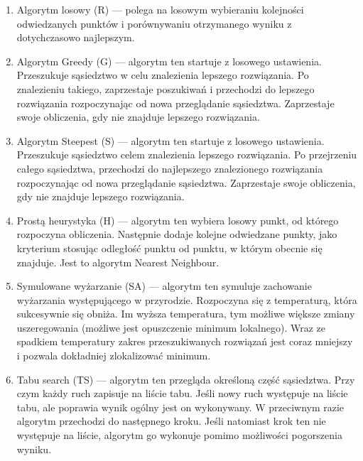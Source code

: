 \begin{enumerate}

\item Algorytm losowy (R) --- polega na losowym wybieraniu kolejności odwiedzanych punktów i 
porównywaniu otrzymanego wyniku z dotychczasowo najlepszym.

\item Algorytm Greedy (G) --- algorytm ten startuje z losowego ustawienia. Przeszukuje 
sąsiedztwo w celu znalezienia lepszego rozwiązania. Po znalezieniu takiego, zaprzestaje 
poszukiwań i przechodzi do lepszego rozwiązania rozpoczynając od nowa przeglądanie sąsiedztwa.
Zaprzestaje swoje obliczenia, gdy nie znajduje lepszego rozwiązania.

\item Algorytm Steepest (S) --- algorytm ten startuje z losowego ustawienia. Przeszukuje 
sąsiedztwo celem znalezienia lepszego rozwiązania. Po przejrzeniu całego sąsiedztwa, przechodzi 
do najlepszego znalezionego rozwiązania rozpoczynając od nowa przeglądanie sąsiedztwa.
Zaprzestaje swoje obliczenia, gdy nie znajduje lepszego rozwiązania.

\item Prostą heurystyka (H) --- algorytm ten wybiera losowy punkt, od którego rozpoczyna obliczenia.
Następnie dodaje kolejne odwiedzane punkty, jako kryterium stosując odległość punktu od punktu, w 
którym obecnie się znajduje. Jest to algorytm Nearest Neighbour.

\item Symulowane wyżarzanie (SA) --- algorytm ten symuluje zachowanie wyżarzania występującego w 
przyrodzie. Rozpoczyna się z temperaturą, która sukcesywnie się obniża. Im wyższa temperatura, tym
możliwe większe zmiany uszeregowania (możliwe jest opuszczenie minimum lokalnego). Wraz ze spadkiem 
temperatury zakres przeszukiwanych rozwiązań jest coraz mniejszy i pozwala dokładniej zlokalizować
minimum.

\item Tabu search (TS) --- algorytm ten przegląda określoną część sąsiedztwa. Przy czym każdy ruch 
zapisuje na liście tabu. Jeśli nowy ruch występuje na liście tabu, ale poprawia wynik ogólny jest
on wykonywany. W przeciwnym razie algorytm przechodzi do następnego kroku. Jeśli natomiast krok 
ten nie występuje na liście, algorytm go wykonuje pomimo możliwości pogorszenia wyniku.


\end{enumerate}

